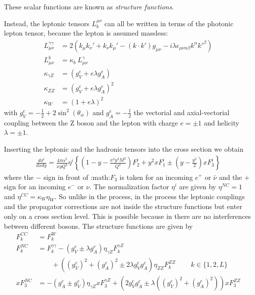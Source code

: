 These scalar functions are known as \dis \textit{structure functions}.

Instead, the leptonic tensors $L_b^{\mu\nu}$ can all be written in terms of the photonic
lepton tensor, because the lepton is assumed massless:
\begin{align}
    L^{\gamma\gamma}_{\mu\nu} &= 2\left(k_{\mu}k_{\nu}' + k_{\nu}k_{\mu}' - (k\cdot k') g_{\mu\nu} - i\lambda \epsilon_{\mu\nu\alpha\beta}k^{\alpha}k'^{\beta}\right)\\
    L^{b}_{\mu\nu} &= \kappa_b ~ L^{\gamma}_{\mu\nu}\\
    \kappa_{\gamma Z} &= (g_V^e + e\lambda g_A^e)\\
    \kappa_{ZZ} &= (g_V^e + e\lambda g_A^e)^2\\
    \kappa_{W} &= (1 + e\lambda)^2
\end{align}
with $g_V^e = -\frac 1 2 + 2\sin^2(\theta_w)$ and $g_A^e = -\frac 1 2$ the
vectorial and axial-vectorial coupling between the Z boson and the lepton with
charge $e=\pm 1$ and helicity $\lambda=\pm 1$.

Inserting the leptonic and the hadronic tensors into the cross section we obtain
\begin{align}
    \frac{d\sigma^i}{dx dy} = \frac{4\pi \alpha^2}{x y Q^2} \eta^i \left\{
    \left(1-y - \frac{x^2 y^2 M^2}{Q^2}\right)F_2^i
    + y^2 x F_1^i
    \pm \left(y - \frac {y^2}{2} \right) x F_3^i
    \right\}
\end{align}
where the $-$ sign in front of :math:$F_3$ is taken for an incoming $e^+$ or
$\bar \nu$ and the $+$ sign for an incoming $e^-$ or $\nu$.
The normalization factor $\eta^i$ are given by $\eta^{NC} = 1$ and $\eta^{CC} =
\kappa_W \eta_W$. So unlike in the \nc process, in the \cc process the leptonic
couplings and the propagator corrections are not inside the structure functions
but enter only on a cross section level. 
This is possible because in \cc there are no interferences between different bosons. 
The structure functions are given by
\begin{align}
    F_k^{CC} &= F_k^W\\
    F_k^{NC} &= F_k^{\gamma\gamma} - (g_V^e \pm \lambda g_A^e) \eta_{\gamma Z} F_k^{\gamma Z} \nonumber\\
             &\qquad + \left((g_V^e)^2 + (g_A^e)^2  \pm 2 \lambda g_V^e g_A^e \right) 
             \eta_{ZZ} F_k^{ZZ} \qquad~ k\in\{1,2,L\} \\
    x F_3^{NC} &= -(g_A^e \pm g_V^e) \eta_{\gamma Z} x F_3^{\gamma Z}
    + \left(2g_V^e g_A^e \pm \lambda((g_V^e)^2 + (g_A^e)^2)\right) x F_3^{ZZ}
\end{align}

